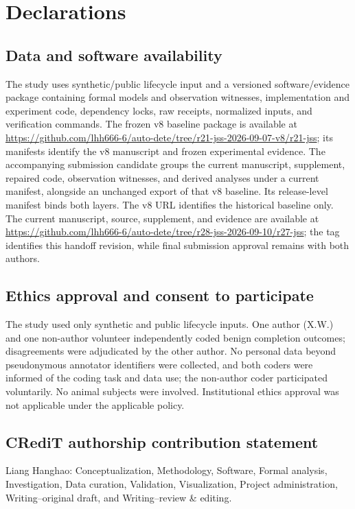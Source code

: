 \section*{Declarations}

\subsection*{Data and software availability}

The study uses synthetic/public lifecycle input and a versioned software/evidence package containing formal models and observation witnesses, implementation and experiment code, dependency locks, raw receipts, normalized inputs, and verification commands. The frozen v8 baseline package is available at \url{https://github.com/lhh666-6/auto-dete/tree/r21-jss-2026-09-07-v8/r21-jss}; its manifests identify the v8 manuscript and frozen experimental evidence. The accompanying submission candidate groups the current manuscript, supplement, repaired code, observation witnesses, and derived analyses under a current manifest, alongside an unchanged export of that v8 baseline. Its release-level manifest binds both layers. The v8 URL identifies the historical baseline only. The current manuscript, source, supplement, and evidence are available at \url{https://github.com/lhh666-6/auto-dete/tree/r28-jss-2026-09-10/r27-jss}; the tag identifies this handoff revision, while final submission approval remains with both authors.

\subsection*{Ethics approval and consent to participate}

The study used only synthetic and public lifecycle inputs. One author (X.W.) and one non-author volunteer independently coded benign completion outcomes; disagreements were adjudicated by the other author. No personal data beyond pseudonymous annotator identifiers were collected, and both coders were informed of the coding task and data use; the non-author coder participated voluntarily. No animal subjects were involved. Institutional ethics approval was not applicable under the applicable policy.

\subsection*{CRediT authorship contribution statement}

Liang Hanghao: Conceptualization, Methodology, Software, Formal analysis, Investigation, Data curation, Validation, Visualization, Project administration, Writing--original draft, and Writing--review \& editing.

